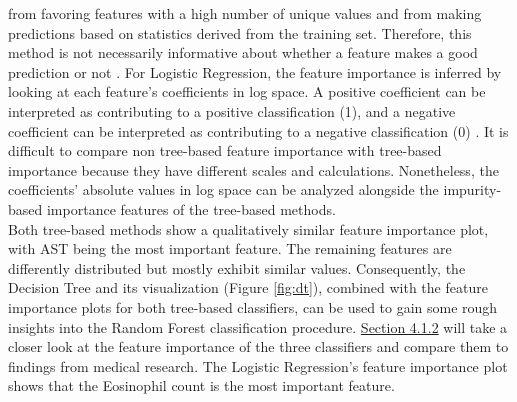 from favoring features with a high number of unique values and from making 
predictions based on statistics derived from the training set. Therefore, this 
method is not necessarily informative about whether a feature makes a 
good prediction or not \cite{RN178}.
For Logistic Regression, the feature importance is inferred by looking at 
each feature's coefficients in log space. A positive coefficient can be 
interpreted as contributing to a positive classification (1), and a negative 
coefficient can be interpreted as contributing to a negative classification (0) 
\cite{RN174}.
It is difficult to compare non tree-based feature importance with tree-based 
importance because they have different scales and calculations. Nonetheless, 
the 
coefficients' absolute values in log space can be analyzed alongside the 
impurity-based importance features of the tree-based methods.
\\
Both tree-based methods show a qualitatively similar feature importance plot, 
with AST being the most important feature. The remaining features are 
differently distributed but mostly exhibit similar values. Consequently, the 
Decision Tree and its visualization (Figure \ref{fig:dt}), combined with the 
feature importance plots for both tree-based classifiers, can be used to gain 
some rough insights into the Random Forest classification procedure. 
\hyperref[sec:medical]{Section 4.1.2} will take a closer look at the feature 
importance of the three classifiers and compare them to findings from medical 
research. The Logistic Regression's feature importance plot shows that the 
Eosinophil count is the most important feature.

